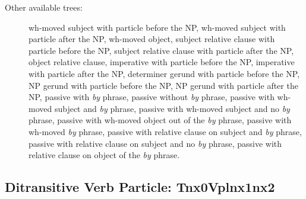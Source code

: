 \begin{description}
\item[Other available trees:] wh-moved subject with particle before the NP,
wh-moved subject with particle after the NP, wh-moved object, subject relative
clause with particle before the NP, subject relative clause with particle after
the NP, object relative clause, imperative with particle before the NP,
imperative with particle after the NP, determiner gerund with particle before
the NP, NP gerund with particle before the NP, NP gerund with particle after
the NP, passive with {\it by} phrase, passive without {\it by} phrase, passive
with wh-moved subject and {\it by} phrase, passive with wh-moved subject and no
{\it by} phrase, passive with wh-moved object out of the {\it by} phrase,
passive with wh-moved {\it by} phrase, passive with relative clause on subject
and {\it by} phrase, passive with relative clause on subject and no {\it by}
phrase, passive with relative clause on object of the {\it by} phrase.

\end{description}




\subsection{Ditransitive Verb Particle: Tnx0Vplnx1nx2}
\label{nx0Vplnx1nx2}

